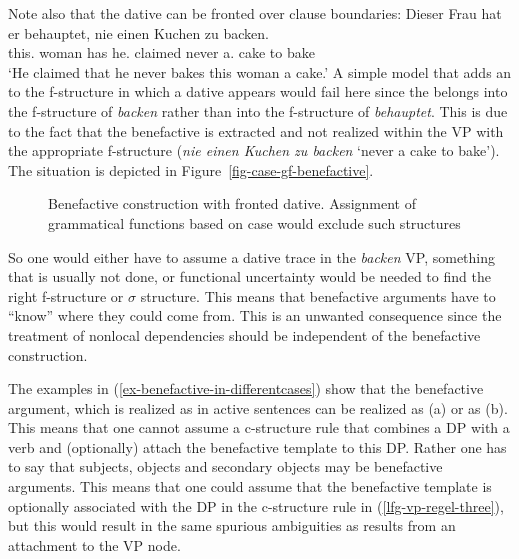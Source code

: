 Note also that the dative can be fronted over clause boundaries:
\ea
\label{ex-dieser-frau-hat-er-behauptet}
\gll Dieser Frau hat er behauptet, nie einen Kuchen zu backen.\\
     this.\dat{} woman has he.\nom{} claimed     never a.\acc{} cake to bake\\
\glt `He claimed that he never bakes this woman a cake.'
\z
A simple model that adds an \objtheta to the f-structure in which a dative appears would fail here since
the \obj belongs into the f-structure of \emph{backen} rather than into the f-structure of
\emph{behauptet}. This is due to the fact that the benefactive is extracted and not realized within
the VP with the appropriate f-structure (\emph{nie einen Kuchen zu backen} `never a cake to
bake'). The situation is depicted in Figure~\vref{fig-case-gf-benefactive}.
\begin{figure}
{}
\caption{Benefactive construction with fronted dative. Assignment of grammatical functions based on
  case would exclude such structures}\label{fig-case-gf-benefactive}
\end{figure}
So one would either have to assume a dative trace in the \emph{backen} VP, something that is usually
not done, or functional uncertainty \citep{KZ89a} would be needed to find the right f-structure or $\sigma$ structure. This 
means that benefactive arguments have to ``know'' where they could come from. This is an unwanted
consequence since the treatment of nonlocal dependencies should be independent of the benefactive construction.

The examples in (\ref{ex-benefactive-in-differentcases}) show that the benefactive argument, which is realized as \objtheta in
active sentences can be realized as \subj (a) or as \obj (b). This
means that one cannot assume a c-structure rule that combines a \objtheta DP with a verb and
(optionally) attach the benefactive template to this DP. Rather one has to say that subjects, objects and secondary
objects may be benefactive arguments. This means that one could assume that the benefactive template
is optionally associated with the DP in the c-structure rule in (\ref{lfg-vp-regel-three}), but this
would result in the same spurious ambiguities as results from an attachment to the VP node. 


